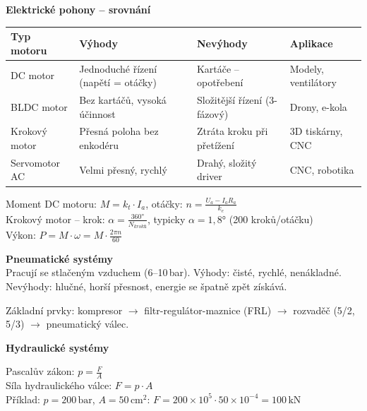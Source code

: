 \documentclass[a4paper,10pt]{article}
\begin{document}
\begin{vysvetlenibox}
\textbf{Elektrické pohony -- srovnání}

\begin{center}
\begin{tabularx}{0.95\linewidth}{@{} l X X X @{}}
    \toprule
    \textbf{Typ motoru} & \textbf{Výhody} & \textbf{Nevýhody}
                        & \textbf{Aplikace} \\
    \midrule
    DC motor       & Jednoduché řízení (napětí = otáčky)
                   & Kartáče -- opotřebení & Modely, ventilátory \\
    BLDC motor     & Bez kartáčů, vysoká účinnost
                   & Složitější řízení (3-fázový) & Drony, e-kola \\
    Krokový motor  & Přesná poloha bez enkodéru
                   & Ztráta kroku při přetížení & 3D tiskárny, CNC \\
    Servomotor AC  & Velmi přesný, rychlý
                   & Drahý, složitý driver & CNC, robotika \\
    \bottomrule
\end{tabularx}
\end{center}

\begin{vzorcebox}
Moment DC motoru: $M = k_t \cdot I_a$,
otáčky: $n = \frac{U_a - I_a R_a}{k_e}$\\
Krokový motor -- krok: $\alpha = \frac{360°}{N_{kroků}}$,
typicky $\alpha = 1{,}8°$ (200 kroků/otáčku)\\
Výkon: $P = M \cdot \omega = M \cdot \frac{2\pi n}{60}$
\end{vzorcebox}

\textbf{Pneumatické systémy}\\
Pracují se stlačeným vzduchem (6--10\,bar).
Výhody: čisté, rychlé, nenákladné.
Nevýhody: hlučné, horší přesnost, energie se špatně zpět získává.

Základní prvky: kompresor $\to$ filtr-regulátor-maznice (FRL)
$\to$ rozvaděč (5/2, 5/3) $\to$ pneumatický válec.

\textbf{Hydraulické systémy}

\begin{vzorcebox}
Pascalův zákon: $p = \frac{F}{A}$ \quad [Pa = N/m²]\\
Síla hydraulického válce: $F = p \cdot A$\\
Příklad: $p = 200\,\text{bar}$, $A = 50\,\text{cm}^2$:
$F = 200 \times 10^5 \cdot 50 \times 10^{-4} = 100\,\text{kN}$
\end{vzorcebox}


\end{vysvetlenibox}
\end{document}
